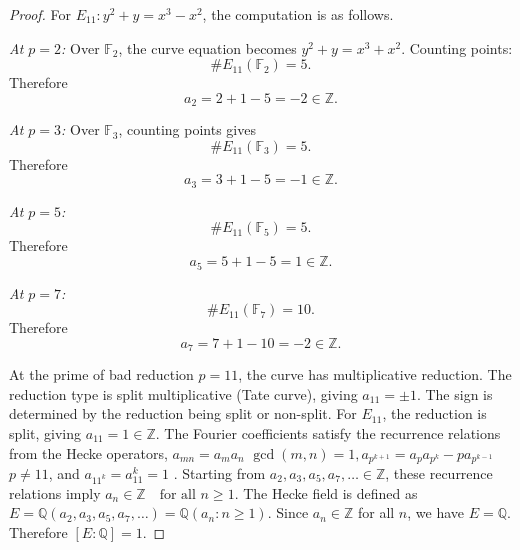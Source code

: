 \documentclass[10pt,a4paper]{amsart}
\newcommand{\Q}{\mathbb{Q}}
\newcommand{\Z}{\mathbb{Z}}
\begin{document}
\begin{proof}
For $E_{11}: y^2 + y = x^3 - x^2$, the computation is as follows.

\textit{At $p = 2$:}
Over $\mathbb{F}_2$, the curve equation becomes $y^2 + y = x^3 + x^2$. Counting points:
$$\#E_{11}(\mathbb{F}_2) = 5.$$
Therefore
$$a_2 = 2 + 1 - 5 = -2 \in \Z.$$

\textit{At $p = 3$:}
Over $\mathbb{F}_3$, counting points gives
$$\#E_{11}(\mathbb{F}_3) = 5.$$
Therefore
$$a_3 = 3 + 1 - 5 = -1 \in \Z.$$

\textit{At $p = 5$:}
$$\#E_{11}(\mathbb{F}_5) = 5.$$
Therefore
$$a_5 = 5 + 1 - 5 = 1 \in \Z.$$

\textit{At $p = 7$:}
$$\#E_{11}(\mathbb{F}_7) = 10.$$
Therefore
$$a_7 = 7 + 1 - 10 = -2 \in \Z. $$

At the prime of bad reduction $p = 11$, the curve has multiplicative reduction. The reduction type is split multiplicative (Tate curve), giving $a_{11} = \pm 1$.
The sign is determined by the reduction being split or non-split. For $E_{11}$, the reduction is split, giving
$a_{11} = 1 \in \Z$.
The Fourier coefficients satisfy the recurrence relations from the Hecke operators, $a_{mn} = a_m a_n$  $\gcd(m,n) = 1, a_{p^{k+1}} = a_p a_{p^k} - p a_{p^{k-1}}$   $p \neq 11$, and 
$a_{11^k} = a_{11}^k = 1$ . Starting from $a_2, a_3, a_5, a_7, \ldots \in \Z$, these recurrence relations imply
$a_n \in \Z \quad \text{for all } n \geq 1$. The Hecke field is defined as
$E = \Q(a_2, a_3, a_5, a_7, \ldots) = \Q(a_n : n \geq 1)$. Since $a_n \in \Z$ for all $n$, we have
$E = \Q$. Therefore $[E : \Q] = 1$.
\end{proof}
\end{document}
